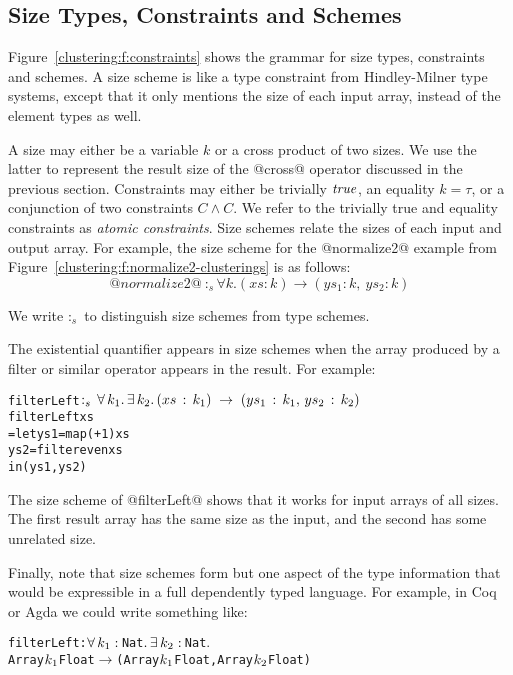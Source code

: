 \newcommand{\constr}[1]{\llbracket #1 \rrbracket}


\subsection{Size Types, Constraints and Schemes}
\label{clustering:s:SizeTypes}
Figure~\ref{clustering:f:constraints} shows the grammar for size types, constraints and schemes. A size scheme is like a type constraint from Hindley-Milner type systems, except that it only mentions the size of each input array, instead of the element types as well.

A size may either be a variable $k$ or a cross product of two sizes. We use the latter to represent the result size of the @cross@ operator discussed in the previous section. Constraints may either be trivially $\mathit{true}$, an equality $k = \tau$, or a conjunction of two constraints $C \wedge C$. We refer to the trivially true and equality constraints as \emph{atomic constraints}. Size schemes relate the sizes of each input and output array. For example, the size scheme for the @normalize2@ example from Figure~\ref{clustering:f:normalize2-clusterings} is as follows:
$$@normalize2@ ~:_s \forall k. (xs : k) \to (ys_1 : k,~ ys_2 : k)
$$

We write $:_s$ to distinguish size schemes from type schemes.

The existential quantifier appears in size schemes when the array produced by a filter or similar operator appears in the result. For example:
\begin{alltt}
 filterLeft \(:\sb{s}\,\forall\,k\sb{1}.\,\exists\,k\sb{2}.\,(xs\,:\,k\sb{1})\;\to\;(ys\sb{1}\,:\,k\sb{1},\,ys\sb{2}\,:\,k\sb{2})\)
 filterLeft xs
   = let ys1 = map (+ 1)   xs
         ys2 = filter even xs
     in (ys1, ys2)
\end{alltt}

The size scheme of @filterLeft@ shows that it works for input arrays of all sizes. The first result array has the same size as the input, and the second has some unrelated size.

Finally, note that size schemes form but one aspect of the type information that would be expressible in a full dependently typed language. For example, in Coq or Agda we could write something like:
\begin{alltt}
 filterLeft : \(\forall\,k\sb{1}:\,\)Nat\(.\,\exists\,k\sb{2}:\,\)Nat\(.\) 
   Array \(k\sb{1}\) Float \(\to\) (Array \(k\sb{1}\) Float, Array \(k\sb{2}\) Float)
\end{alltt}

